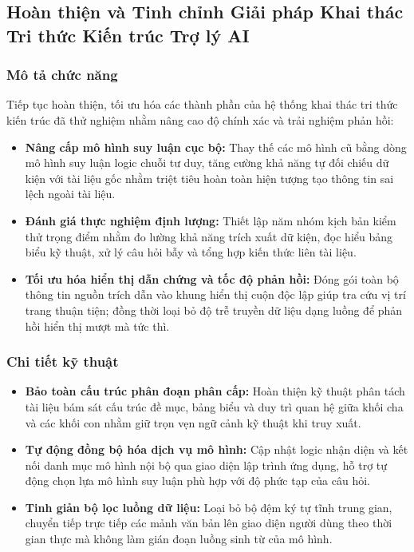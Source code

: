 \subsection{Hoàn thiện và Tinh chỉnh Giải pháp Khai thác Tri thức Kiến trúc Trợ lý AI}

\subsubsection{Mô tả chức năng}
Tiếp tục hoàn thiện, tối ưu hóa các thành phần của hệ thống khai thác tri thức kiến trúc đã thử nghiệm nhằm nâng cao độ chính xác và trải nghiệm phản hồi:
\begin{itemize}
    \item \textbf{Nâng cấp mô hình suy luận cục bộ:} Thay thế các mô hình cũ bằng dòng mô hình suy luận logic chuỗi tư duy, tăng cường khả năng tự đối chiếu dữ kiện với tài liệu gốc nhằm triệt tiêu hoàn toàn hiện tượng tạo thông tin sai lệch ngoài tài liệu.
    \item \textbf{Đánh giá thực nghiệm định lượng:} Thiết lập năm nhóm kịch bản kiểm thử trọng điểm nhằm đo lường khả năng trích xuất dữ kiện, đọc hiểu bảng biểu kỹ thuật, xử lý câu hỏi bẫy và tổng hợp kiến thức liên tài liệu.
    \item \textbf{Tối ưu hóa hiển thị dẫn chứng và tốc độ phản hồi:} Đóng gói toàn bộ thông tin nguồn trích dẫn vào khung hiển thị cuộn độc lập giúp tra cứu vị trí trang thuận tiện; đồng thời loại bỏ độ trễ truyền dữ liệu dạng luồng để phản hồi hiển thị mượt mà tức thì.
\end{itemize}

\subsubsection{Chi tiết kỹ thuật}
\begin{itemize}
    \item \textbf{Bảo toàn cấu trúc phân đoạn phân cấp:} Hoàn thiện kỹ thuật phân tách tài liệu bám sát cấu trúc đề mục, bảng biểu và duy trì quan hệ giữa khối cha và các khối con nhằm giữ trọn vẹn ngữ cảnh kỹ thuật khi truy xuất.
    \item \textbf{Tự động đồng bộ hóa dịch vụ mô hình:} Cập nhật logic nhận diện và kết nối danh mục mô hình nội bộ qua giao diện lập trình ứng dụng, hỗ trợ tự động chọn lựa mô hình suy luận phù hợp với độ phức tạp của câu hỏi.
    \item \textbf{Tinh giản bộ lọc luồng dữ liệu:} Loại bỏ bộ đệm ký tự tĩnh trung gian, chuyển tiếp trực tiếp các mảnh văn bản lên giao diện người dùng theo thời gian thực mà không làm gián đoạn luồng sinh từ của mô hình.
\end{itemize}

